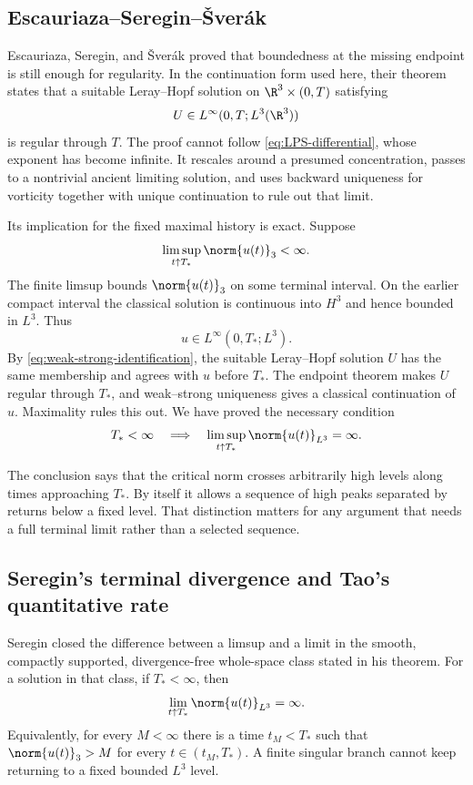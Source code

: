 \subsection{Escauriaza--Seregin--\v{S}ver\'ak}

Escauriaza, Seregin, and \v{S}ver\'ak proved that boundedness at the missing
endpoint is still enough for regularity.  In the continuation form
used here, their theorem states that a suitable Leray--Hopf solution on
\(\R^3\times(0,T)\) satisfying
\[
 U\in L^\infty(0,T;L^3(\R^3))
\]
is regular through \(T\).  The proof cannot follow
\eqref{eq:LPS-differential}, whose exponent has become infinite.  It rescales
around a presumed concentration, passes to a nontrivial ancient limiting
solution, and uses backward uniqueness for vorticity together with unique
continuation to rule out that limit.

Its implication for the fixed maximal history is exact.  Suppose
\[
 \limsup_{t\uparrow T_*}\norm{u(t)}_3<\infty.
\]
The finite limsup bounds \(\norm{u(t)}_3\) on some terminal interval.  On the
earlier compact interval the classical solution is continuous into \(H^3\)
and hence bounded in \(L^3\).  Thus
\[
 u\in L^\infty(0,T_*;L^3).
\]
By \eqref{eq:weak-strong-identification}, the suitable Leray--Hopf solution
\(U\) has the same membership and agrees with \(u\) before \(T_*\).  The
endpoint theorem makes \(U\) regular through \(T_*\), and weak--strong
uniqueness gives a classical continuation of \(u\).  Maximality rules this
out.  We have proved the necessary condition
\begin{equation}
 T_*<\infty
 \quad\Longrightarrow\quad
 \limsup_{t\uparrow T_*}\norm{u(t)}_{L^3}=\infty.
 \label{eq:ESS-blowup}
\end{equation}

The conclusion says that the critical norm crosses arbitrarily high levels
along times approaching \(T_*\).  By itself it allows a sequence of high peaks
separated by returns below a fixed level.  That distinction matters for any
argument that needs a full terminal limit rather than a selected sequence.

\subsection{Seregin's terminal divergence and Tao's quantitative rate}

Seregin closed the difference between a limsup and a limit in the smooth,
compactly supported, divergence-free whole-space class stated in his theorem.
For a solution in that class, if \(T_*<\infty\), then
\begin{equation}
 \lim_{t\uparrow T_*}\norm{u(t)}_{L^3}=\infty.
 \label{eq:seregin-L3-divergence}
\end{equation}
Equivalently, for every \(M<\infty\) there is a time \(t_M<T_*\) such that
\(\norm{u(t)}_3>M\) for every \(t\in(t_M,T_*)\).
A finite singular branch cannot keep returning to a
fixed bounded \(L^3\) level.

